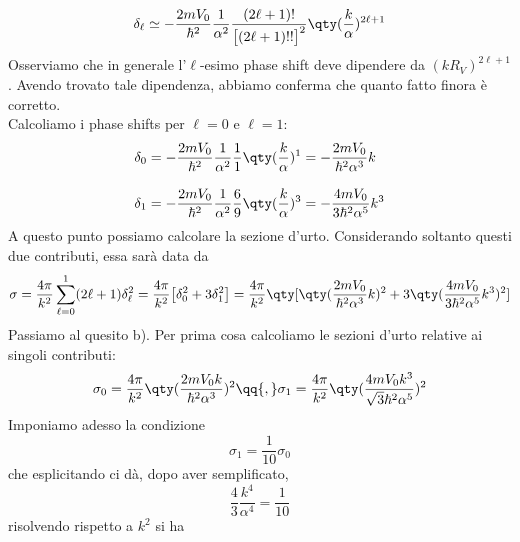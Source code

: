 \begin{soluzione}
   \begin{equation*}
      \delta_{\ell}
      \simeq -\frac{2 m V_0}{\hbar^2} \frac{1}{\alpha^2} \frac{(2 \ell + 1)!}{\bigl[ (2 \ell + 1)!! \bigr]^2} \qty( \frac{k}{\alpha} )^{2 \ell + 1}
   \end{equation*}
   Osserviamo che in generale l'$\ell$-esimo phase shift deve dipendere da $(kR_V)^{2 \ell + 1}$. Avendo trovato tale dipendenza, abbiamo conferma che quanto fatto finora è corretto.\\
   Calcoliamo i phase shifts per $\ell=0$ e $\ell=1$:
   \begin{equation*}
      \begin{split}
         \delta_0
         & =-\frac{2 m V_0}{\hbar^2} \frac{1}{\alpha^2} \frac{1}{1} \qty( \frac{k}{\alpha} )^{1}
         =-\frac{2 m V_0}{\hbar^2 \alpha^3} k
         \\[0.3cm]
         \delta_1
         & =-\frac{2 m V_0}{\hbar^2} \frac{1}{\alpha^2} \frac{6}{9} \qty( \frac{k}{\alpha} )^{3}
         =-\frac{4 m V_0}{3 \hbar^2 \alpha^5} k^3
      \end{split}
   \end{equation*}
   A questo punto possiamo calcolare la sezione d'urto. Considerando soltanto questi due contributi, essa sarà data da
   \begin{equation*}
      \sigma
      =\frac{4\pi}{k^2} \sum_{\ell=0}^{1} (2 \ell + 1) \delta_{\ell}^2
      =\frac{4\pi}{k^2} \bigl[ \delta_0^2 + 3\delta_1^2 \bigr]
      =\frac{4\pi}{k^2} \qty[ \qty( \frac{2 m V_0}{\hbar^2 \alpha^3} k )^2 + 3 \qty( \frac{4 m V_0}{3 \hbar^2 \alpha^5} k^3 )^2 ]
   \end{equation*}
   Passiamo al quesito b). Per prima cosa calcoliamo le sezioni d'urto relative ai singoli contributi:
   \begin{equation*}
      \sigma_0
      =\frac{4 \pi}{k^2} \qty( \frac{2 m V_0 k}{\hbar^2 \alpha^3} )^2
      \qq{,}
      \sigma_1
      =\frac{4 \pi}{k^2} \qty( \frac{4 m V_0 k^3}{\sqrt{3} \hbar^2 \alpha^5} )^2
   \end{equation*}
   Imponiamo adesso la condizione
   \begin{equation*}
      \sigma_1
      =\frac{1}{10} \sigma_0
   \end{equation*}
   che esplicitando ci dà, dopo aver semplificato,
   \begin{equation*}
      \frac{4}{3} \frac{k^4}{\alpha^4}
      =\frac{1}{10}
   \end{equation*}
   risolvendo rispetto a $k^2$ si ha
   \begin{equation*}

\end{equation*}
\end{soluzione}
